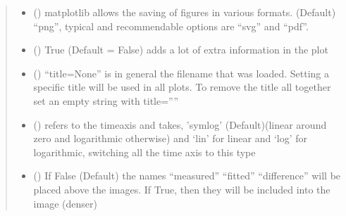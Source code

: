 \documentclass[letterpaper,10pt,english]{sphinxmanual}
\begin{document}
\begin{fulllineitems}
\begin{quote}
\begin{description}
\begin{itemize}
\item {} 
 (\sphinxstyleliteralemphasis{\sphinxupquote{ (}}\sphinxstyleliteralemphasis{\sphinxupquote{)}}\sphinxstyleliteralemphasis{\sphinxupquote{, }}) \textendash{} matplotlib allows the saving of figures in various formats. (Default) “png”,
typical and recommendable options are “svg” and “pdf”.

\item {} 
 (\sphinxstyleliteralemphasis{\sphinxupquote{, }}) \textendash{} True (Default = False) adds a lot of extra information in the plot

\item {} 
 (\sphinxstyleliteralemphasis{\sphinxupquote{, }}) \textendash{} “title=None” is in general the filename that was loaded. Setting a
specific title will be used in all plots. To remove the title all
together set an empty string with title=””

\item {} 
 (\sphinxstyleliteralemphasis{\sphinxupquote{, }}) \textendash{} refers to the time\sphinxhyphen{}axis and takes, ’symlog’ (Default)(linear around zero and logarithmic otherwise)
and ‘lin’ for linear and  ‘log’ for logarithmic, switching all the time axis to this type

\item {} 
 (\sphinxstyleliteralemphasis{\sphinxupquote{, }}) \textendash{} If False (Default) the names “measured” “fitted” “difference” will be placed above the images.
If True, then they will be included into the image (denser)


\end{itemize}
\end{description}
\end{quote}
\end{fulllineitems}
\end{document}

